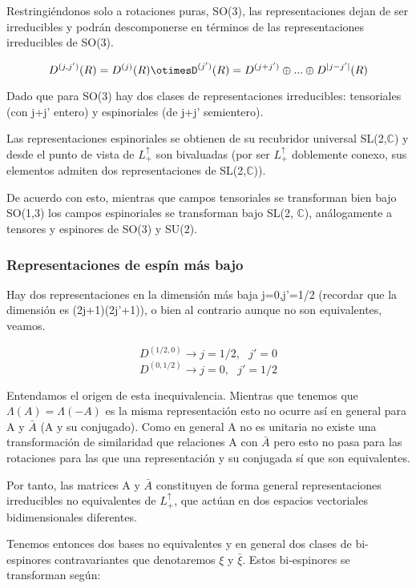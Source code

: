 \documentclass{article}
\begin{document}
        Restringiéndonos solo a rotaciones puras, SO(3), las representaciones dejan de ser irreducibles y podrán descomponerse en términos de las representaciones irreducibles de SO(3).

        $$D^{(j,j')}(R)=D^{(j)}(R)\otimesD^{(j')}(R)=D^{(j+j')}\oplus ... \oplus D^{|j-j'|}(R)$$

        Dado que para SO(3) hay dos clases de representaciones irreducibles: tensoriales (con j+j' entero) y espinoriales (de j+j' semientero).

        Las representaciones espinoriales se obtienen de su recubridor universal SL(2,$\mathds{C}$) y desde el punto de vista de $L^\uparrow _+$ son bivaluadas (por ser $L^\uparrow _+$ doblemente conexo, sus elementos admiten dos representaciones de SL(2,$\mathds{C}$)).

        \smallskip
        De acuerdo con esto, mientras que campos tensoriales se transforman bien bajo SO(1,3) los campos espinoriales se transforman bajo SL(2, $\mathds{C}$), análogamente a tensores y espinores de SO(3) y SU(2).

        \subsubsection{Representaciones de espín más bajo}

        Hay dos representaciones en la dimensión más baja j=0,j'=1/2 (recordar que la dimensión es (2j+1)(2j'+1)), o bien al contrario aunque no son equivalentes, veamos.

        $$D^{(1/2,0)} \longrightarrow j=1/2, \ \ \ j'=0$$
         $$D^{(0, 1/2)} \longrightarrow j=0, \ \ \ j'=1/2$$

         Entendamos el origen de esta inequivalencia. Mientras que tenemos que $\Lambda (A)=\Lambda (-A)$ es la misma representación esto no ocurre así en general para A y $\bar{A}$ (A y su conjugado). Como en general A no es unitaria no existe una transformación de similaridad que relaciones A con $\bar{A}$ pero esto no pasa para las rotaciones para las que una representación y su conjugada sí que son equivalentes.

         \smallskip
         Por tanto, las matrices A y $\bar{A}$ constituyen de forma general representaciones irreducibles no equivalentes de $L^\uparrow _+$, que actúan en dos espacios vectoriales bidimensionales diferentes.

         Tenemos entonces dos bases no equivalentes y en general dos clases de bi-espinores contravariantes que denotaremos $\xi$ y $\bar{\xi}$. Estos bi-espinores se transforman según:
\end{document}
